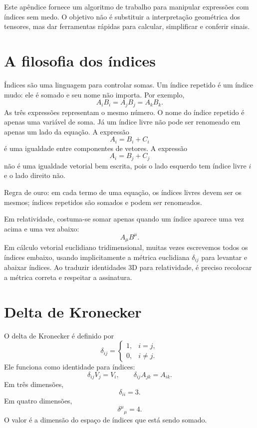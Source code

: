 \documentclass[12pt,a4paper,oneside]{book}
\theoremstyle{rgplain}
\theoremstyle{rgremark}
\begin{document}
Este apêndice fornece um algoritmo de trabalho para
manipular expressões com índices sem medo. O objetivo não é substituir a
interpretação geométrica dos tensores, mas dar ferramentas rápidas para
calcular, simplificar e conferir sinais.

\section{A filosofia dos índices}

Índices são uma linguagem para controlar somas. Um índice repetido é um índice
mudo: ele é somado e seu nome não importa. Por exemplo,
\[
  A_iB_i=A_jB_j=A_kB_k.
\]
As três expressões representam o mesmo número. O nome do índice repetido é
apenas uma variável de soma. Já um índice livre não pode ser renomeado em
apenas um lado da equação. A expressão
\[
  A_i=B_i+C_i
\]
é uma igualdade entre componentes de vetores. A expressão
\[
  A_i=B_j+C_j
\]
não é uma igualdade vetorial bem escrita, pois o lado esquerdo tem índice livre
$i$ e o lado direito não.

\begin{resultado}
Regra de ouro: em cada termo de uma equação, os índices livres devem ser os
mesmos; índices repetidos são somados e podem ser renomeados.
\end{resultado}

Em relatividade, costuma-se somar apenas quando um índice aparece uma vez
acima e uma vez abaixo:
\[
  A_\mu B^\mu.
\]
Em cálculo vetorial euclidiano tridimensional, muitas vezes escrevemos todos
os índices embaixo, usando implicitamente a métrica euclidiana
$\delta_{ij}$ para levantar e abaixar índices. Ao traduzir identidades 3D para
relatividade, é preciso recolocar a métrica correta e respeitar a assinatura.

\section{Delta de Kronecker}

O delta de Kronecker é definido por
\[
  \delta_{ij}=
  \begin{cases}
  1, & i=j,\\
  0, & i\ne j.
  \end{cases}
\]
Ele funciona como identidade para índices:
\[
  \delta_{ij}V_j=V_i,
  \qquad
  \delta_{ij}A_{jk}=A_{ik}.
\]
Em três dimensões,
\[
  \delta_{ii}=3.
\]
Em quatro dimensões,
\[
  \delta^\mu{}_\mu=4.
\]
O valor é a dimensão do espaço de índices que está sendo somado.
\end{document}
